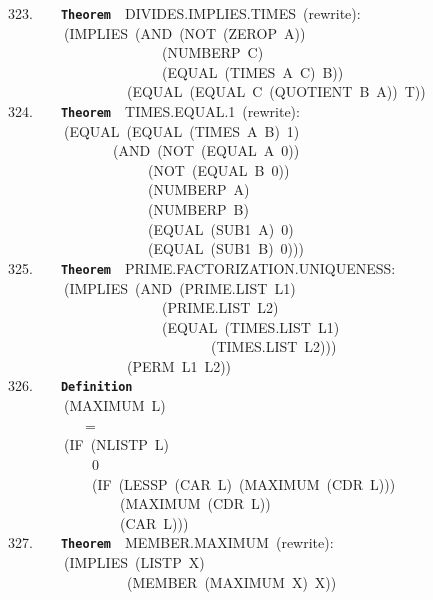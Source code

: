 \documentclass[11pt]{book}
\newenvironment{pubasis}{\begin{flushleft}\ttfamily\small}{\normalsize\rmfamily\end{flushleft}}
\newcommand{\axiomordefinition}[1]{\vspace{6pt}\texttt{\textbf{#1}}}
\begin{document}
\begin{pubasis}
323.~~~~\axiomordefinition{Theorem}~~DIVIDES.IMPLIES.TIMES~(rewrite):\\
~~~~~~~~(IMPLIES~(AND~(NOT~(ZEROP~A))\\
~~~~~~~~~~~~~~~~~~~~~~(NUMBERP~C)\\
~~~~~~~~~~~~~~~~~~~~~~(EQUAL~(TIMES~A~C)~B))\\
~~~~~~~~~~~~~~~~~(EQUAL~(EQUAL~C~(QUOTIENT~B~A))~T))\\

324.~~~~\axiomordefinition{Theorem}~~TIMES.EQUAL.1~(rewrite):\\
~~~~~~~~(EQUAL~(EQUAL~(TIMES~A~B)~1)\\
~~~~~~~~~~~~~~~(AND~(NOT~(EQUAL~A~0))\\
~~~~~~~~~~~~~~~~~~~~(NOT~(EQUAL~B~0))\\
~~~~~~~~~~~~~~~~~~~~(NUMBERP~A)\\
~~~~~~~~~~~~~~~~~~~~(NUMBERP~B)\\
~~~~~~~~~~~~~~~~~~~~(EQUAL~(SUB1~A)~0)\\
~~~~~~~~~~~~~~~~~~~~(EQUAL~(SUB1~B)~0)))\\

325.~~~~\axiomordefinition{Theorem}~~PRIME.FAC\-TOR\-I\-ZA\-TION.UNIQUENESS:\\
~~~~~~~~(IMPLIES~(AND~(PRIME.LIST~L1)\\
~~~~~~~~~~~~~~~~~~~~~~(PRIME.LIST~L2)\\
~~~~~~~~~~~~~~~~~~~~~~(EQUAL~(TIMES.LIST~L1)\\
~~~~~~~~~~~~~~~~~~~~~~~~~~~~~(TIMES.LIST~L2)))\\
~~~~~~~~~~~~~~~~~(PERM~L1~L2))\\

326.~~~~\axiomordefinition{Definition}\\
~~~~~~~~(MAXIMUM~L)\\
~~~~~~~~~~~=\\
~~~~~~~~(IF~(NLISTP~L)\\
~~~~~~~~~~~~0\\
~~~~~~~~~~~~(IF~(LESSP~(CAR~L)~(MAXIMUM~(CDR~L)))\\
~~~~~~~~~~~~~~~~(MAXIMUM~(CDR~L))\\
~~~~~~~~~~~~~~~~(CAR~L)))\\

327.~~~~\axiomordefinition{Theorem}~~MEMBER.MAX\-I\-MUM~(rewrite):\\
~~~~~~~~(IMPLIES~(LISTP~X)\\
~~~~~~~~~~~~~~~~~(MEMBER~(MAXIMUM~X)~X))\\


\end{pubasis}
\end{document}
